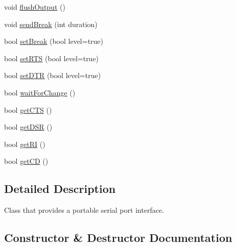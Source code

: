 \begin{DoxyCompactItemize}
void \hyperlink{classserial_1_1_serial_a95e0d6dcf2b7b9aa45225bfb1647c427}{flush\+Output} ()
\item 
void \hyperlink{classserial_1_1_serial_ab35e474beb136258cbeb04978be27455}{send\+Break} (int duration)
\item 
bool \hyperlink{classserial_1_1_serial_abb7eef9db06c582e2e504733b4150968}{set\+Break} (bool level=true)
\item 
bool \hyperlink{classserial_1_1_serial_a7c91f22768107389f52d80d691994fc7}{set\+R\+TS} (bool level=true)
\item 
bool \hyperlink{classserial_1_1_serial_a4c8a44a1e6ce42f8cb521d9a4e10bc59}{set\+D\+TR} (bool level=true)
\item 
bool \hyperlink{classserial_1_1_serial_a9d889dc0ec2cec50a620650f10cf8e83}{wait\+For\+Change} ()
\item 
bool \hyperlink{classserial_1_1_serial_a97603438c9ded81a886f914b7a335d7f}{get\+C\+TS} ()
\item 
bool \hyperlink{classserial_1_1_serial_a91a00816bce6a163ea022b4cf8d4ce0e}{get\+D\+SR} ()
\item 
bool \hyperlink{classserial_1_1_serial_a29a1f68b9a238e9a6a833373855708ce}{get\+RI} ()
\item 
bool \hyperlink{classserial_1_1_serial_a5a7c1a8e363b530147970155d0f6fe8d}{get\+CD} ()
\end{DoxyCompactItemize}


\subsection{Detailed Description}
Class that provides a portable serial port interface. 

\subsection{Constructor \& Destructor Documentation}
